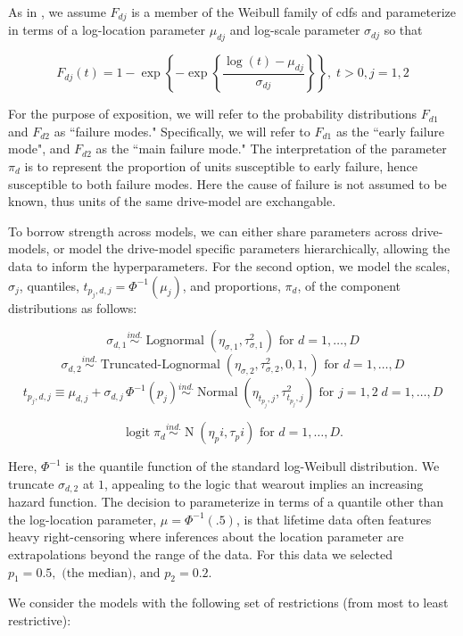 \documentclass[12pt]{article}
\newcommand{\ind}{\stackrel{ind.}{\sim}}
\newcommand{\op}{\operatorname}
\begin{document}
As in \cite{chan}, we assume $F_{dj}$ is a member of the Weibull family of cdfs and parameterize in terms of a log-location parameter $\mu_{dj}$ and log-scale parameter $\sigma_{dj}$ so that

$$F_{dj}(t) = 1 - \exp \left\{ -\exp \left\{ \frac{ \log (t) - \mu_{dj}}{\sigma_{dj}} \right\} \right\},\; t>0, j=1,2$$

For the purpose of exposition, we will refer to the probability distributions $F_{d1}$ and $F_{d2}$ as ``failure modes." Specifically, we will refer to $F_{d1}$ as the ``early failure mode", and $F_{d2}$ as the ``main failure mode." The interpretation of the parameter $\pi_d$ is to represent the proportion of units susceptible to early failure, hence susceptible to both failure modes. Here the cause of failure is not assumed to be known, thus units of the same drive-model are exchangable.

To borrow strength across models, we can either share parameters across drive-models, or model the drive-model specific parameters hierarchically, allowing the data to inform the hyperparameters. For the second option, we model the scales, $\sigma_j$, quantiles, $t_{p_j,d,j} = \Phi^{-1}(\mu_j)$, and proportions, $\pi_d$, of the component distributions as follows:

$$\sigma_{d,1} \ind \op{Lognormal} \left( \eta_{\sigma,1}, \tau^2_{\sigma,1} \right) \mbox{ for } d=1,\ldots,D$$
$$\sigma_{d,2} \ind \op{Truncated-Lognormal} \left( \eta_{\sigma,2}, \tau^2_{\sigma,2} , 0, 1, \right) \mbox{ for } d=1,\ldots,D$$
$$t_{p_j,d,j} \equiv \mu_{d,j} + \sigma_{d,j}\,\Phi^{-1}(p_j)  \ind \op{Normal} \left(\eta_{t_{p_j},j}, \tau^2_{t_{p_j},j}\right) \mbox{ for } j=1,2\; d=1,\ldots,D$$

$$\op{logit} \pi_d \ind \op{N}(\eta_pi, \tau_pi) \mbox{ for } d=1,\ldots,D.$$

Here, $\Phi^{-1}$ is the quantile function of the standard log-Weibull distribution. We truncate $\sigma_{d,2}$ at $1$, appealing to the logic that wearout implies an increasing hazard function. The decision to parameterize in terms of a quantile other than the log-location parameter, $\mu = \Phi^{-1}(.5)$, is that lifetime data often features heavy right-censoring where inferences about the location parameter are extrapolations beyond the range of the data. For this data we selected $p_1=0.5,\mbox{ (the median), and } p_2 = 0.2$.

We consider the models with the following set of restrictions (from most to least restrictive):
\end{document}
